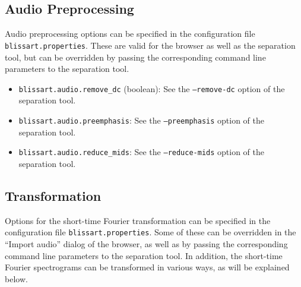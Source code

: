 \subsection{Audio Preprocessing}
\label{section:ConfigFileAudio}

Audio preprocessing options can be specified in the configuration file {\tt
  blissart.properties}. These are valid for the browser as well as the
separation tool, but can be overridden by passing the corresponding command line
parameters to the separation tool.

\begin{itemize}
  \item {\tt blissart.audio.remove\_dc} (boolean): See the {\tt --remove-dc}
    option of the separation tool.
  \item {\tt blissart.audio.preemphasis}: See the {\tt --preemphasis} option of
    the separation tool.
  \item {\tt blissart.audio.reduce\_mids}: See the {\tt --reduce-mids} option of
    the separation tool.
\end{itemize}


\subsection{Transformation}
\label{section:ConfigFileFFT}

Options for the short-time Fourier transformation can be specified in the
configuration file {\tt blissart.properties}. Some of these can be overridden in the
``Import audio'' dialog of the browser, as well as by passing the corresponding
command line parameters to the separation tool. In addition, the short-time
Fourier spectrograms can be transformed in various ways, as will be explained
below.

